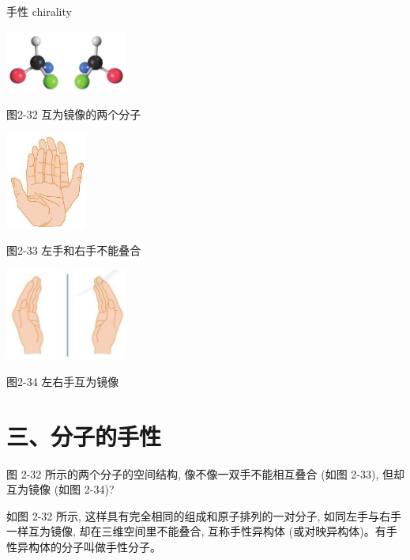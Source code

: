 \documentclass[10pt]{article}
\begin{document}
\begin{mdframed}

手性 chirality

\begin{center}
\includegraphics[max width=0.3\textwidth]{images/0190e026-5a11-7df7-bd27-54d09026ba7a_63_213673.jpg}
\end{center}

图2-32 互为镜像的两个分子

\begin{center}
\includegraphics[max width=0.2\textwidth]{images/0190e026-5a11-7df7-bd27-54d09026ba7a_63_205263.jpg}
\end{center}

图2-33 左手和右手不能叠合

\begin{center}
\includegraphics[max width=0.3\textwidth]{images/0190e026-5a11-7df7-bd27-54d09026ba7a_63_367931.jpg}
\end{center}

图2-34 左右手互为镜像

\end{mdframed}

\section*{三、分子的手性}

图 2-32 所示的两个分子的空间结构, 像不像一双手不能相互叠合 (如图 2-33), 但却互为镜像 (如图 2-34)?

如图 2-32 所示, 这样具有完全相同的组成和原子排列的一对分子, 如同左手与右手一样互为镜像, 却在三维空间里不能叠合, 互称手性异构体 (或对映异构体)。有手性异构体的分子叫做手性分子。
\end{document}
